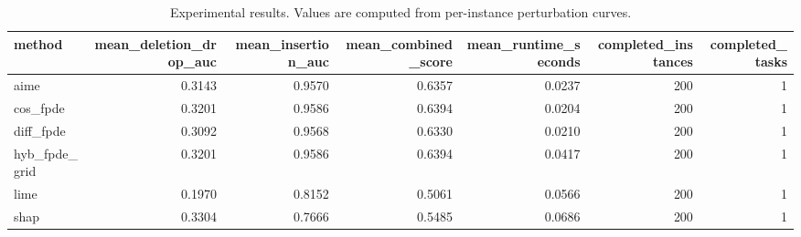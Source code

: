 \begin{table}[t]
\caption{Experimental results. Values are computed from per-instance perturbation curves.}
\label{tab:main_results_computed}
\centering
\begin{tabular}{lrrrrrr}
\toprule
method & mean\_deletion\_drop\_auc & mean\_insertion\_auc & mean\_combined\_score & mean\_runtime\_seconds & completed\_instances & completed\_tasks \\
\midrule
aime & 0.3143 & 0.9570 & 0.6357 & 0.0237 & 200 & 1 \\
cos\_fpde & 0.3201 & 0.9586 & 0.6394 & 0.0204 & 200 & 1 \\
diff\_fpde & 0.3092 & 0.9568 & 0.6330 & 0.0210 & 200 & 1 \\
hyb\_fpde\_grid & 0.3201 & 0.9586 & 0.6394 & 0.0417 & 200 & 1 \\
lime & 0.1970 & 0.8152 & 0.5061 & 0.0566 & 200 & 1 \\
shap & 0.3304 & 0.7666 & 0.5485 & 0.0686 & 200 & 1 \\
\bottomrule
\end{tabular}

\end{table}
